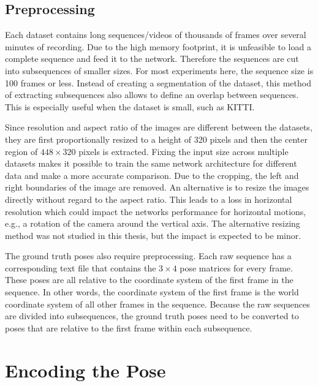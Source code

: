 		\subsection{Preprocessing}\label{sec:preprocessing}
			Each dataset contains long sequences/videos of thousands of frames over several minutes of recording.
			Due to the high memory footprint, it is unfeasible to load a complete sequence and feed it to the network.
			Therefore the sequences are cut into subsequences of smaller sizes. 
			For most experiments here, the sequence size is 100 frames or less.
			Instead of creating a segmentation of the dataset, this method of extracting subsequences also allows to define an overlap between sequences.
			This is especially useful when the dataset is small, such as KITTI.
			
			Since resolution and aspect ratio of the images are different between the datasets, they are first proportionally resized to a height of 320 pixels and then the center region of $448 \times 320$ pixels is extracted.
			Fixing the input size across multiple datasets makes it possible to train the same network architecture for different data and make a more accurate comparison.
			Due to the cropping, the left and right boundaries of the image are removed.
			An alternative is to resize the images directly without regard to the aspect ratio.
			This leads to a loss in horizontal resolution which could impact the networks performance for horizontal motions, e.g., a rotation of the camera around the vertical axis.
			The alternative resizing method was not studied in this thesis, but the impact is expected to be minor.
			
			The ground truth poses also require preprocessing. 
			Each raw sequence has a corresponding text file that contains the $3 \times 4$ pose matrices for every frame.
			These poses are all relative to the coordinate system of the first frame in the sequence.
			In other words, the coordinate system of the first frame is the world coordinate system of all other frames in the sequence.
			Because the raw sequences are divided into subsequences, the ground truth poses need to be converted to poses that are relative to the first frame within each subsequence.
			
			
	\section{Encoding the Pose}
	
